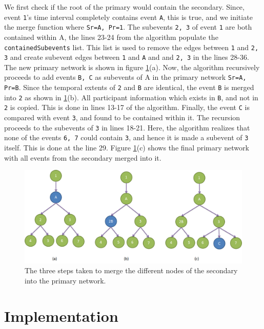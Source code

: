 We first check if the root of the primary would contain the secondary. Since, event \texttt{1}'s time interval completely contains event \texttt{A}, this is true, and we initiate the merge function where \texttt{Sr=A, Pr=1}. The subevents \texttt{2, 3} of event \texttt{1} are both contained within A, the lines 23-24 from the algorithm populate the \texttt{containedSubevents} list. This list is used to remove the edges between \texttt{1} and \texttt{2, 3} and create subevent edges between \texttt{1} and \texttt{A} and  and \texttt{2, 3} in the lines 28-36. The new primary network is shown in figure \ref{fig:merge-output-stages}(a). Now, the algorithm recursively proceeds to add events \texttt{B, C} as subevents of A in the primary network \texttt{Sr=A, Pr=B}. Since the temporal extents of \texttt{2} and \texttt{B} are identical, the event \texttt{B} is merged into \texttt{2} as shown in \ref{fig:merge-output-stages}(b). All participant information which exists in \texttt{B}, and not in \texttt{2} is copied. This is done in lines 13-17 of the algorithm. Finally, the event \texttt{C} is compared with event \texttt{3}, and found to be contained within it. The recursion proceeds to the subevents of \texttt{3} in lines 18-21. Here, the algorithm realizes that none of the events \texttt{6, 7} could contain \texttt{3}, and hence it is made a subevent of \texttt{3} itself. This is done at the line 29. Figure \ref{fig:merge-output-stages}(c) shows the final primary network with all events from the secondary merged into it.

\begin{figure}[h]
\centering
\includegraphics[width=\textwidth]{media/chapter4/merge-example-output.png}
\caption{The three steps taken to merge the different nodes of the secondary into the primary network.}
\label{fig:merge-output-stages}
\end{figure}



\section{Implementation}

